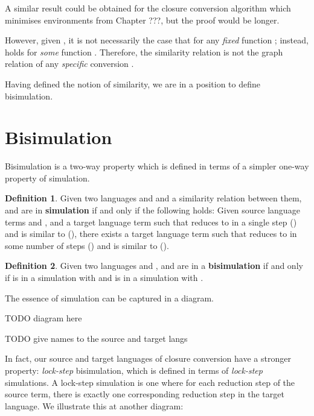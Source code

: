 \documentclass[bsc,frontabs,twoside,singlespacing,parskip,deptreport]{infthesis}
\theoremstyle{definition}
\newtheorem*{definition}{Definition}
\begin{document}

A similar result could be obtained for the closure conversion
algorithm which minimises environments from Chapter ???, but the proof
would be longer.

However, given , it is not
necessarily the case that  for any \textit{fixed}
function ; instead,  holds for \textit{some}
function . Therefore, the similarity relation is not the graph
relation of any \textit{specific} conversion .

Having defined the notion of similarity, we are in a position to
define bisimulation.

\section{Bisimulation}

Bisimulation is a two-way property which is defined in terms of a
simpler one-way property of simulation.

\begin{definition}{}
Given two languages  and  and a similarity relation
\AS{\_\textasciitilde\_}
between them,  and  are in \textbf{simulation} if and only
if the following holds:
Given source language terms  and , and a target language
term  such that  reduces to  in a single step () and
 is similar to  (), there exists a target
language term  such that  reduces to  in some
number of steps () and  is similar to  ().
\end{definition}

\begin{definition}
Given two languages  and ,   and  are in a
\textbf{bisimulation} if and only if  is in a simulation with  and
 is in a simulation with .
\end{definition}

The essence of simulation can be captured in a diagram.

TODO diagram here

TODO give names to the source and target langs

In fact, our source and target languages of closure conversion have a
stronger property: \textit{lock-step} bisimulation, which is defined
in terms of \textit{lock-step} simulations. A lock-step simulation is
one where for each reduction step of the source term, there is exactly
one corresponding reduction step in the target language. We illustrate
this at another diagram:
\end{document}
